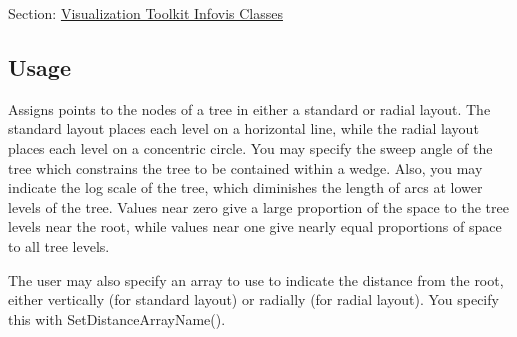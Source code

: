 Section\-: \hyperlink{sec_vtkinfovis}{Visualization Toolkit Infovis Classes} \hypertarget{vtkwidgets_vtkxyplotwidget_Usage}{}\subsection{Usage}\label{vtkwidgets_vtkxyplotwidget_Usage}
Assigns points to the nodes of a tree in either a standard or radial layout. The standard layout places each level on a horizontal line, while the radial layout places each level on a concentric circle. You may specify the sweep angle of the tree which constrains the tree to be contained within a wedge. Also, you may indicate the log scale of the tree, which diminishes the length of arcs at lower levels of the tree. Values near zero give a large proportion of the space to the tree levels near the root, while values near one give nearly equal proportions of space to all tree levels.

The user may also specify an array to use to indicate the distance from the root, either vertically (for standard layout) or radially (for radial layout). You specify this with Set\-Distance\-Array\-Name().

